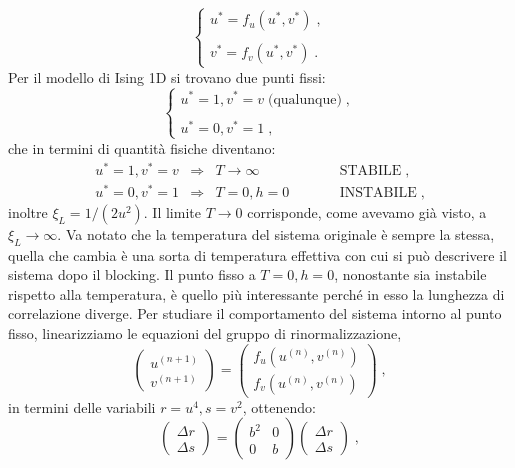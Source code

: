 \documentclass[12pt,a4paper]{article}
\theoremstyle{definition}
\numberwithin{equation}{section}
\begin{document}
\begin{equation}
\begin{cases}
u^*=f_u(u^*,v^*)\;, \\
\\
v^*=f_v(u^*,v^*)\;.
\end{cases}
\end{equation}
Per il modello di Ising 1D si trovano due punti fissi:
\begin{equation}
\begin{cases}
u^*=1,v^*=v\; \mbox{(qualunque)}\;, \\
\\
u^*=0,v^*=1\;,
\end{cases}
\end{equation}
che in termini di quantità fisiche diventano:
\begin{equation}
\begin{matrix}
u^*=1,v^*=v & \Longrightarrow & T\to\infty & \qquad & \mbox{STABILE}\;, \\
u^*=0,v^*=1 & \Longrightarrow & T=0,h=0 & \qquad & \mbox{INSTABILE}\;,
\end{matrix}
\end{equation}
inoltre $\xi_L=1/(2u^2)$. Il limite $T\to 0$ corrisponde, come avevamo già visto, a $\xi_L\to\infty$. Va notato che la temperatura del sistema originale è sempre la stessa, quella che cambia è una sorta di temperatura effettiva con cui si può descrivere il sistema dopo il blocking. Il punto fisso a $T=0,h=0$, nonostante sia instabile rispetto alla temperatura, è quello più interessante perché in esso la lunghezza di correlazione diverge. Per studiare il comportamento del sistema intorno al punto fisso, linearizziamo le equazioni del gruppo di rinormalizzazione,
$$
\left(\begin{matrix}
u^{(n+1)} \\
v^{(n+1)}
\end{matrix}\right)=\left(\begin{matrix}
f_u(u^{(n)},v^{(n)}) \\
f_v(u^{(n)},v^{(n)})
\end{matrix}\right)\;,
$$
in termini delle variabili $r=u^4,s=v^2$, ottenendo:
\begin{equation}
\left(\begin{matrix}
\Delta r \\
\Delta s
\end{matrix}\right)=\left(\begin{matrix}
b^2 & 0 \\
0 & b
\end{matrix}\right)\left(\begin{matrix}
\Delta r\\
\Delta s
\end{matrix}\right)\;,
\end{equation}
\end{document}
